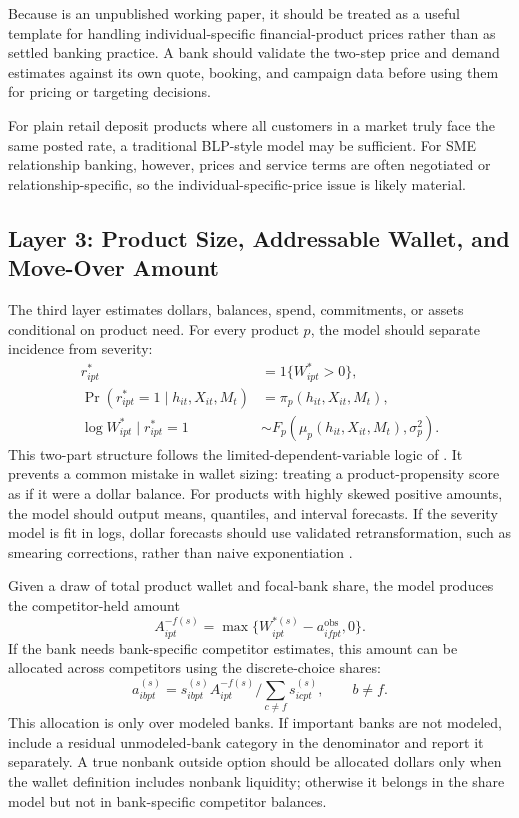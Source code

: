 \documentclass[11pt]{article}
\begin{document}
Because \citet{ma2024discrete} is an unpublished working paper, it should be
treated as a useful template for handling individual-specific financial-product
prices rather than as settled banking practice. A bank should validate the
two-step price and demand estimates against its own quote, booking, and
campaign data before using them for pricing or targeting decisions.

For plain retail deposit products where all customers in a market truly face
the same posted rate, a traditional BLP-style model may be sufficient. For SME
relationship banking, however, prices and service terms are often negotiated or
relationship-specific, so the individual-specific-price issue is likely
material.

\subsection{Layer 3: Product Size, Addressable Wallet, and Move-Over Amount}

The third layer estimates dollars, balances, spend, commitments, or assets
conditional on product need. For every product $p$, the model should separate
incidence from severity:
\[
\begin{aligned}
  r_{ipt}^{*} &= 1\{W_{ipt}^{*}>0\},\\
  \Pr(r_{ipt}^{*}=1\mid h_{it},X_{it},M_t) &= \pi_p(h_{it},X_{it},M_t),\\
  \log W_{ipt}^{*}\mid r_{ipt}^{*}=1
    &\sim F_p(\mu_p(h_{it},X_{it},M_t),\sigma_p^2).
\end{aligned}
\]
This two-part structure follows the limited-dependent-variable logic of
\citet{cragg1971limited}. It prevents a common mistake in wallet sizing:
treating a product-propensity score as if it were a dollar balance. For
products with highly skewed positive amounts, the model should output means,
quantiles, and interval forecasts. If the severity model is fit in logs, dollar
forecasts should use validated retransformation, such as smearing corrections,
rather than naive exponentiation \citep{duan1983smearing}.

Given a draw of total product wallet and focal-bank share, the model produces
the competitor-held amount
\[
  A_{ipt}^{-f(s)}
  =
  \max\{W_{ipt}^{*(s)}-a_{ifpt}^{\mathrm{obs}},0\}.
\]
If the bank needs bank-specific competitor estimates, this amount can be
allocated across competitors using the discrete-choice shares:
\[
  a_{ibpt}^{(s)}
  =
  s_{ibpt}^{(s)} A_{ipt}^{-f(s)}
  \bigg/
  \sum_{c\neq f}s_{icpt}^{(s)},
  \qquad b\neq f.
\]
This allocation is only over modeled banks. If important banks are not modeled,
include a residual unmodeled-bank category in the denominator and report it
separately. A true nonbank outside option should be allocated dollars only when
the wallet definition includes nonbank liquidity; otherwise it belongs in the
share model but not in bank-specific competitor balances.
\end{document}
